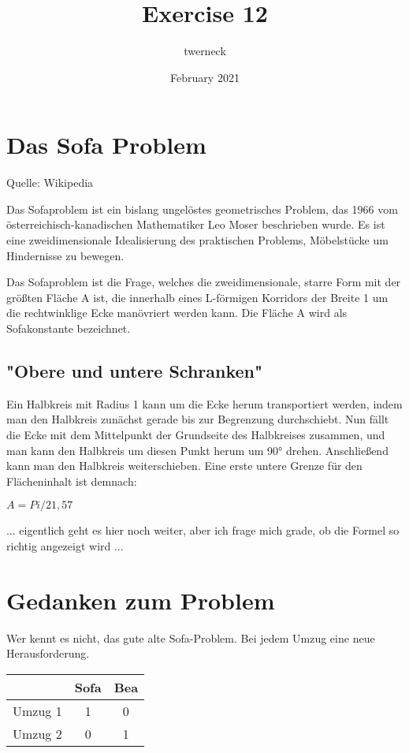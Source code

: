 \documentclass{scrartcl}
\title{Exercise 12}
\author{twerneck }
\date{February 2021}
\begin{document}
\maketitle

\tableofcontents

\section{Das Sofa Problem}
Quelle: Wikipedia

Das Sofaproblem ist ein bislang ungelöstes geometrisches Problem, das 1966 vom österreichisch-kanadischen Mathematiker Leo Moser beschrieben wurde. Es ist eine zweidimensionale Idealisierung des praktischen Problems, Möbelstücke um Hindernisse zu bewegen.

Das Sofaproblem ist die Frage, welches die zweidimensionale, starre Form mit der größten Fläche A ist, die innerhalb eines L-förmigen Korridors der Breite 1 um die rechtwinklige Ecke manövriert werden kann. Die Fläche A wird als Sofakonstante bezeichnet.


\subsection{"Obere und untere Schranken"}
Ein Halbkreis mit Radius 1 kann um die Ecke herum transportiert werden, indem man den Halbkreis zunächst gerade bis zur Begrenzung durchschiebt. Nun fällt die Ecke mit dem Mittelpunkt der Grundseite des Halbkreises zusammen, und man kann den Halbkreis um diesen Punkt herum um 90° drehen. Anschließend kann man den Halbkreis weiterschieben. Eine erste untere Grenze für den Flächeninhalt ist demnach:

$ A = Pi / 2  1,57 $



... eigentlich geht es hier noch weiter, aber ich frage mich grade, ob die Formel so richtig angezeigt wird ...


\section{Gedanken zum Problem}
Wer kennt es nicht, das gute alte Sofa-Problem. Bei jedem Umzug eine neue Herausforderung. 


\begin{tabular}{c|c|c}
    \hline
        &  Sofa & Bea \\
    \hline
    Umzug 1 & 1 & 0\\
    
    \hline
     Umzug 2 & 0 & 1
    
\end{tabular}
\end{document}
